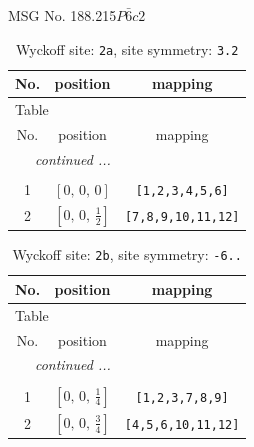 \documentclass[fleqn,8pt]{jsarticle}
\begin{document}
\setcounter{MaxMatrixCols}{32}

\renewcommand{\tablename}{Table~}
\renewcommand{\figurename}{Figure~}
\begin{center}
\LARGE
MSG No. 188.215\quad$P\bar{6}c2$
\end{center}
\renewcommand{\arraystretch}{1.2}
\begin{longtable}{ccc}
\caption{Wyckoff site: {\tt 2a}, site symmetry: {\tt 3.2}}
 \\
 \hline \hline
No. & position & mapping \\ \hline \endfirsthead

\multicolumn{2}{l}{\tablename\ \thetable{}} \\
 \hline \hline
No. & position & mapping \\ \hline \endhead

 \hline \hline
\multicolumn{2}{r}{\footnotesize\it continued ...} \\ \endfoot

 \hline \hline
\multicolumn{2}{r}{} \\ \endlastfoot

1 & $\left[ 0,\, 0,\, 0 \right]$ & {\tt [1,2,3,4,5,6]} \\ \hline
2 & $\left[ 0,\, 0,\, \frac{1}{2} \right]$ & {\tt [7,8,9,10,11,12]} \\
\end{longtable}
\renewcommand{\arraystretch}{1.2}
\begin{longtable}{ccc}
\caption{Wyckoff site: {\tt 2b}, site symmetry: {\tt -6..}}
 \\
 \hline \hline
No. & position & mapping \\ \hline \endfirsthead

\multicolumn{2}{l}{\tablename\ \thetable{}} \\
 \hline \hline
No. & position & mapping \\ \hline \endhead

 \hline \hline
\multicolumn{2}{r}{\footnotesize\it continued ...} \\ \endfoot

 \hline \hline
\multicolumn{2}{r}{} \\ \endlastfoot

1 & $\left[ 0,\, 0,\, \frac{1}{4} \right]$ & {\tt [1,2,3,7,8,9]} \\ \hline
2 & $\left[ 0,\, 0,\, \frac{3}{4} \right]$ & {\tt [4,5,6,10,11,12]} \\
\end{longtable}
\renewcommand{\arraystretch}{1.2}
\end{document}
